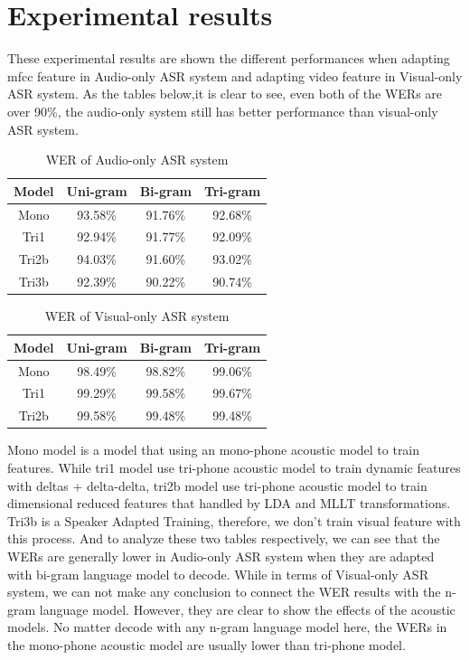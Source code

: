 \chapter{Experimental results}
These experimental results are shown the different performances when adapting mfcc feature in Audio-only ASR system and adapting video feature in Visual-only ASR system. As the tables below,it is clear to see, even both of the WERs are over 90\%, the audio-only system still has better performance than visual-only ASR system.
\begin{table}[ht]
\center
\begin{tabular}{c|c|c|c}

Model & Uni-gram & Bi-gram & Tri-gram\\ \hline
Mono &93.58\% &91.76\% & 92.68\%\\ 
Tri1 &92.94\% &91.77\% & 92.09\%\\ 
Tri2b &94.03\% &91.60\% & 93.02\% \\ 
Tri3b &92.39\% &90.22\% & 90.74\%\\ 
\end{tabular}
\caption{WER of Audio-only ASR system}
\label{tab:AWER}
\end{table}

\begin{table}[ht]
\center
\begin{tabular}{c|c|c|c}

Model & Uni-gram & Bi-gram & Tri-gram\\ \hline
Mono &98.49\% &98.82\% & 99.06\%\\ 
Tri1 &99.29\% &99.58\% & 99.67\%\\ 
Tri2b &99.58\% &99.48\% & 99.48\% \\ 
\end{tabular}
\caption{WER of Visual-only ASR system}
\label{tab:VWER}
\end{table}
Mono model is a model that using an mono-phone acoustic model to train features. While tri1 model use tri-phone acoustic model to train dynamic features with deltas + delta-delta, tri2b model use tri-phone acoustic model to train dimensional reduced features that handled by LDA and MLLT transformations. Tri3b is a Speaker Adapted Training, therefore, we don't train visual feature with this process.   
And to analyze these two tables respectively, we can see that the WERs are generally lower in Audio-only ASR system when they are adapted with bi-gram language model to decode. While in terms of Visual-only ASR system, we can not make any conclusion to connect the WER results with the n-gram language model. However, they are clear to show the effects of the acoustic models. No matter decode with any n-gram language model here, the WERs in the mono-phone acoustic model are usually lower than tri-phone model. 

